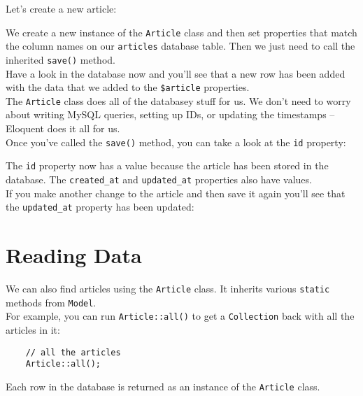 Let's create a new article:


We create a new instance of the \texttt{Article} class and then set properties that match the column names on our \texttt{articles} database table. Then we just need to call the inherited \texttt{save()} method.
\\

Have a look in the database now and you'll see that a new row has been added with the data that we added to the \texttt{\$article} properties.
\\

The \texttt{Article} class does all of the databasey stuff for us. We don't need to worry about writing MySQL queries, setting up IDs, or updating the timestamps – Eloquent does it all for us.
\\

Once you've called the \texttt{save()} method, you can take a look at the \texttt{id} property:


The \texttt{id} property now has a value because the article has been stored in the database. The \texttt{created\_at} and \texttt{updated\_at} properties also have values.
\\

If you make another change to the article and then save it again you'll see that the \texttt{updated\_at} property has been updated:



\section{Reading Data}

We can also find articles using the \texttt{Article} class. It inherits various \texttt{static} methods from \texttt{Model}.
\\

For example, you can run \texttt{Article::all()} to get a \texttt{Collection} back with all the articles in it:

\begin{verbatim}
    // all the articles
    Article::all();
\end{verbatim}

Each row in the database is returned as an instance of the \texttt{Article} class.
\\

